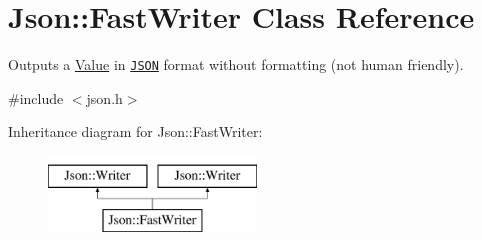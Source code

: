 \hypertarget{class_json_1_1_fast_writer}{}\section{Json\+:\+:Fast\+Writer Class Reference}
\label{class_json_1_1_fast_writer}


Outputs a \hyperlink{class_json_1_1_value}{Value} in \href{http://www.json.org}{\tt J\+S\+ON} format without formatting (not human friendly).  




{\ttfamily \#include $<$json.\+h$>$}

Inheritance diagram for Json\+:\+:Fast\+Writer\+:\begin{figure}[H]
\begin{center}
\leavevmode
\includegraphics[height=2.000000cm]{class_json_1_1_fast_writer}
\end{center}
\end{figure}
